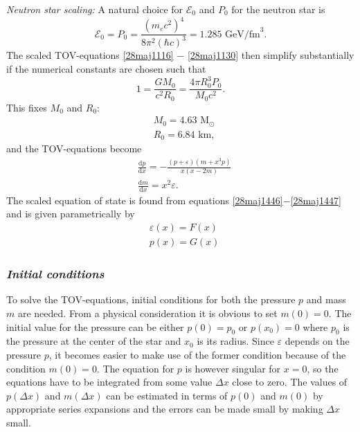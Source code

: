 \documentclass[twocolumn]{article}
\begin{document}
\begin{large}
\textit{Neutron star scaling:}
A natural choice for $\mathcal{E}_0$ and $P_0$ for the neutron star is
\begin{equation}
    \mathcal{E}_0 = P_0 = \frac{(m_ec^2)^4}{8\pi^2(\hbar c)^3} = 1.285 \text{ GeV/fm}^3.
\end{equation}
The scaled TOV-equations \eqref{28maj1116} $-$ \eqref{28maj1130} then simplify substantially if the numerical constants are chosen such that
\begin{equation}
    \label{26maj1005}
    1 = \frac{GM_0}{c^2R_0} = \frac{4\pi R_0^3P_0}{M_0c^2}.
\end{equation}
This fixes $M_0$ and $R_0$:
\begin{equation}
    \begin{split}
    &M_0 = 4.63 \text{ M}_\odot \\ 
    &R_0 = 6.84 \text{ km},
    \end{split}
\end{equation}
and the TOV-equations become
\begin{equation}
    \label{24maj1640}
    \begin{split}
        &\frac{\text{d}p}{\text{d}x} = -\frac{(p+\varepsilon)(m+x^3p)}{x(x-2m)} \\  %
        &\frac{\text{d}m}{\text{d}x} = x^2\varepsilon. %
    \end{split}
\end{equation}
The scaled equation of state is found from equations \eqref{28maj1446}$-$\eqref{28maj1447} and is given parametrically by
\begin{equation}
    \begin{split}
        &\varepsilon(x) = F(x) \\ 
        &p(x) = G(x)
    \end{split}
\end{equation}

\subsubsection*{\textit{Initial conditions}}
To solve the TOV-equations, initial conditions for both the pressure $p$ and mass $m$ are needed. From a physical consideration it is obvious to set $m(0)=0$. The initial value for the pressure can be either $p(0) = p_0$ or $p(x_0) = 0$ where $p_0$ is the pressure at the center of the star and $x_0$ is its radius. Since $\varepsilon$ depends on the pressure $p$, it becomes easier to make use of the former condition because of the condition $m(0)=0$. The equation for $p$ is however singular for $x=0$, so the equations have to be integrated from some value $\Delta x$ close to zero. The values of $p(\Delta x)$ and $m(\Delta x)$ can be estimated in terms of $p(0)$ and $m(0)$ by appropriate series expansions and the errors can be made small by making $\Delta x$ small.


\end{large}
\end{document}

